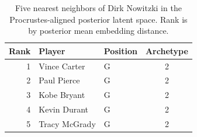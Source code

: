 \begin{table}[htbp]
  \centering\small
  \begin{tabular}{rllc}
    \toprule
    Rank & Player & Position & Archetype \\
    \midrule
    1 & Vince Carter & G & 2 \\
    2 & Paul Pierce & G & 2 \\
    3 & Kobe Bryant & G & 2 \\
    4 & Kevin Durant & G & 2 \\
    5 & Tracy McGrady & G & 2 \\
    \bottomrule
  \end{tabular}
  \caption{Five nearest neighbors of Dirk Nowitzki in the Procrustes-aligned posterior latent space. Rank is by posterior mean embedding distance.}
\end{table}

